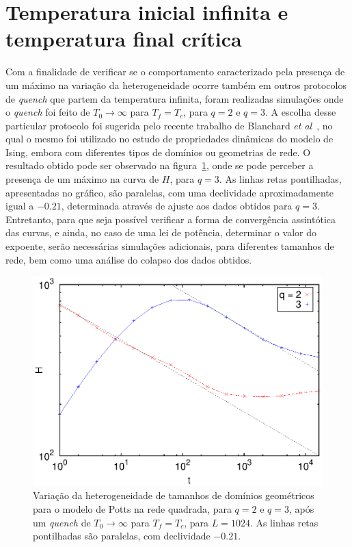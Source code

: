 \section{Temperatura inicial infinita e temperatura final crítica}

Com a finalidade de verificar se o comportamento caracterizado pela presença de um máximo na variação da heterogeneidade ocorre também em outros protocolos de \textit{quench} que partem da temperatura infinita, foram realizadas simulações onde o \textit{quench} foi feito de $T_0\rightarrow \infty$ para $T_f=T_c$, para $q=2$ e $q=3$. A escolha desse particular protocolo foi sugerida pelo recente trabalho de Blanchard \textit{et al}~\cite{BlanchardCugliandoloPicco}, no qual o mesmo foi utilizado no estudo de propriedades dinâmicas do modelo de Ising, embora com diferentes tipos de domínios ou geometrias de rede. O resultado obtido pode ser observado na figura~\ref{fig.het_L1024_Tc_lines}, onde se pode perceber a presença de um máximo na curva de $H$, para $q=3$. As linhas retas pontilhadas, apresentadas no gráfico, são paralelas, com uma declividade aproximadamente igual a $-0.21$, determinada através de ajuste aos dados obtidos para $q=3$. Entretanto, para que seja possível verificar a forma de convergência assintótica das curvas, e ainda, no caso de uma lei de potência, determinar o valor do expoente, serão necessárias simulações adicionais, para diferentes tamanhos de rede, bem como uma análise do colapso dos dados obtidos.

\begin{figure}[h!]
 \centering
 \includegraphics[width=14cm]{fig/het_L1024_Tc_lines.eps}
 \caption{Variação da heterogeneidade de tamanhos de domínios geométricos para o modelo de Potts na rede quadrada, para $q=2$ e $q=3$, após um \textit{quench} de $T_0\rightarrow \infty$ para $T_f=T_c$, para $L=1024$. As linhas retas pontilhadas são paralelas, com declividade $-0.21$.}
\label{fig.het_L1024_Tc_lines}
\end{figure}


